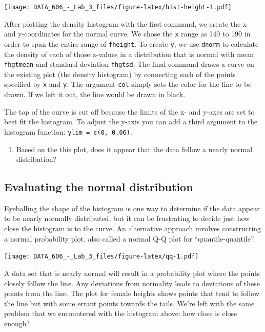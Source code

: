 \documentclass[]{article}
\newenvironment{Shaded}{\begin{snugshade}}{\end{snugshade}}
\newcommand{\KeywordTok}[1]{\textcolor[rgb]{0.13,0.29,0.53}{\textbf{{#1}}}}
\newcommand{\NormalTok}[1]{{#1}}
\providecommand{\tightlist}{%
  \setlength{\itemsep}{0pt}\setlength{\parskip}{0pt}}
\begin{document}
\texttt{[image: DATA\_606\_-\_Lab\_3\_files/figure-latex/hist-height-1.pdf]}

After plotting the density histogram with the first command, we create
the x- and y-coordinates for the normal curve. We chose the \texttt{x}
range as 140 to 190 in order to span the entire range of
\texttt{fheight}. To create \texttt{y}, we use \texttt{dnorm} to
calculate the density of each of those x-values in a distribution that
is normal with mean \texttt{fhgtmean} and standard deviation
\texttt{fhgtsd}. The final command draws a curve on the existing plot
(the density histogram) by connecting each of the points specified by
\texttt{x} and \texttt{y}. The argument \texttt{col} simply sets the
color for the line to be drawn. If we left it out, the line would be
drawn in black.

The top of the curve is cut off because the limits of the x- and y-axes
are set to best fit the histogram. To adjust the y-axis you can add a
third argument to the histogram function: \texttt{ylim\ =\ c(0,\ 0.06)}.

\begin{enumerate}
\def\labelenumi{\arabic{enumi}.}
\setcounter{enumi}{1}
\tightlist
\item
  Based on the this plot, does it appear that the data follow a nearly
  normal distribution?
\end{enumerate}

\subsection{Evaluating the normal
distribution}\label{evaluating-the-normal-distribution}

Eyeballing the shape of the histogram is one way to determine if the
data appear to be nearly normally distributed, but it can be frustrating
to decide just how close the histogram is to the curve. An alternative
approach involves constructing a normal probability plot, also called a
normal Q-Q plot for ``quantile-quantile''.

\begin{Shaded}
\end{Shaded}

\texttt{[image: DATA\_606\_-\_Lab\_3\_files/figure-latex/qq-1.pdf]}

A data set that is nearly normal will result in a probability plot where
the points closely follow the line. Any deviations from normality leads
to deviations of these points from the line. The plot for female heights
shows points that tend to follow the line but with some errant points
towards the tails. We're left with the same problem that we encountered
with the histogram above: how close is close enough?
\end{document}
